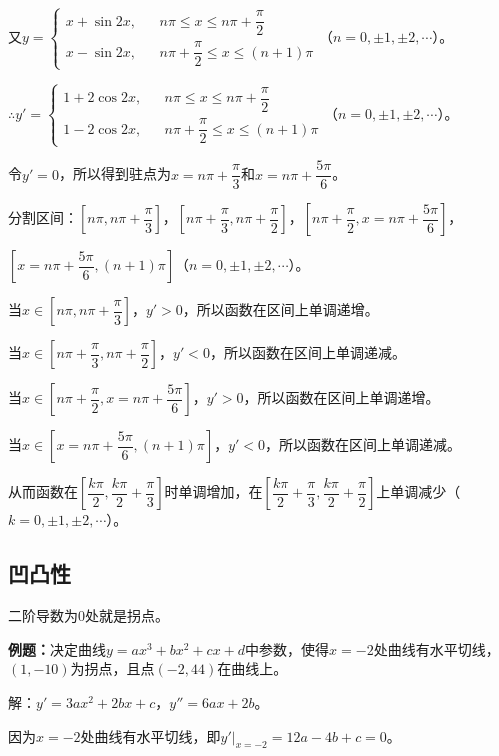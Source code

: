 \documentclass[UTF8, 12pt]{ctexart}
\begin{document}
又$y=\left\{\begin{array}{lcl}
    x+\sin 2x, & & n\pi\leqslant x\leqslant n\pi+\dfrac{\pi}{2} \\
    x-\sin 2x, & &n\pi+\dfrac{\pi}{2}\leqslant x\leqslant (n+1)\pi
\end{array}\right.$（$n=0,\pm 1,\pm2,\cdots$）。

$\therefore y'=\left\{\begin{array}{lcl}
    1+2\cos 2x, & & n\pi\leqslant x\leqslant n\pi+\dfrac{\pi}{2} \\
    1-2\cos 2x, & &n\pi+\dfrac{\pi}{2}\leqslant x\leqslant (n+1)\pi
\end{array}\right.$（$n=0,\pm 1,\pm2,\cdots$）。

令$y'=0$，所以得到驻点为$x=n\pi+\dfrac{\pi}{3}$和$x=n\pi+\dfrac{5\pi}{6}$。

分割区间：$\left[n\pi,n\pi+\dfrac{\pi}{3}\right]$，$\left[n\pi+\dfrac{\pi}{3},n\pi+\dfrac{\pi}{2}\right]$，$\left[n\pi+\dfrac{\pi}{2},x=n\pi+\dfrac{5\pi}{6}\right]$，

$\left[x=n\pi+\dfrac{5\pi}{6},(n+1)\pi\right]$（$n=0,\pm 1,\pm2,\cdots$）。

当$x\in\left[n\pi,n\pi+\dfrac{\pi}{3}\right]$，$y'>0$，所以函数在区间上单调递增。

当$x\in\left[n\pi+\dfrac{\pi}{3},n\pi+\dfrac{\pi}{2}\right]$，$y'<0$，所以函数在区间上单调递减。

当$x\in\left[n\pi+\dfrac{\pi}{2},x=n\pi+\dfrac{5\pi}{6}\right]$，$y'>0$，所以函数在区间上单调递增。

当$x\in\left[x=n\pi+\dfrac{5\pi}{6},(n+1)\pi\right]$，$y'<0$，所以函数在区间上单调递减。

从而函数在$\left[\dfrac{k\pi}{2},\dfrac{k\pi}{2}+\dfrac{\pi}{3}\right]$时单调增加，在$\left[\dfrac{k\pi}{2}+\dfrac{\pi}{3},\dfrac{k\pi}{2}+\dfrac{\pi}{2}\right]$上单调减少（$k=0,\pm 1,\pm2,\cdots$）。

\subsection{凹凸性}

二阶导数为0处就是拐点。

\textbf{例题：}决定曲线$y=ax^3+bx^2+cx+d$中参数，使得$x=-2$处曲线有水平切线，$(1,-10)$为拐点，且点$(-2,44)$在曲线上。

解：$y'=3ax^2+2bx+c$，$y''=6ax+2b$。

因为$x=-2$处曲线有水平切线，即$y'\vert_{x=-2}=12a-4b+c=0$。
\end{document}
